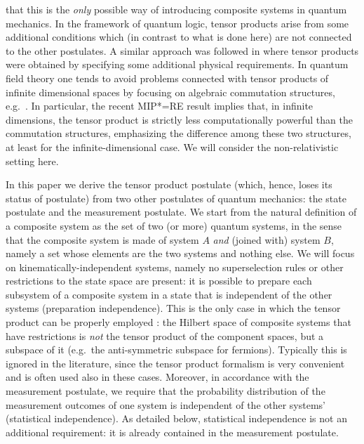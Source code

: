 \documentclass[aps,prl,amsmath,amssymb,twocolumn,nofootinbib]{revtex4}
\theoremstyle{plain}
\theoremstyle{definition}
\theoremstyle{remark}
\begin{document}
	that this is the {\em only} possible way of introducing composite
	systems in quantum mechanics. In the framework of quantum logic,
	tensor products arise from some additional conditions \cite{matolcsi}
	which (in contrast to what is done here) are not connected to the
	other postulates. A similar approach was followed in \cite{aerts}
	where tensor products were obtained by specifying some additional
	physical requirements. In quantum field theory one tends to avoid
	problems connected with tensor products of infinite dimensional spaces
	by focusing on algebraic commutation structures, e.g.~\cite{giddins}.
	In particular, the recent MIP*=RE result \cite{mipre} implies that, in
	infinite dimensions, the tensor product is strictly less
	computationally powerful than the commutation structures, emphasizing
	the difference among these two structures, at least for the
	infinite-dimensional case. We will consider the non-relativistic
	setting here.
	
	In this paper we derive the tensor product postulate (which, hence,
	loses its status of postulate) from two other postulates of quantum
	mechanics: the state postulate and the measurement postulate. We start
	from the natural definition of a composite system as the set of two
	(or more) quantum systems, in the sense that the composite system is
	made of system $A$ {\em and} (joined with) system $B$, namely a set
	whose elements are the two systems and nothing else. We will focus on
	kinematically-independent systems, namely no superselection rules or
	other restrictions to the state space are present: it is possible to
	prepare each subsystem of a composite system in a state that is
	independent of the other systems (preparation independence).  This is
	the only case in which the tensor product can be properly employed
	\cite{susskind,zanardi,zanardilloyd}: the Hilbert space of composite
	systems that have restrictions is {\em not} the tensor product of the
	component spaces, but a subspace of it (e.g.~the anti-symmetric
	subspace for fermions). Typically this is ignored in the literature,
	since the tensor product formalism is very convenient and is often
	used also in these cases. Moreover, in accordance with the measurement
	postulate, we require that the probability distribution of the
	measurement outcomes of one system is independent of the other systems' (statistical
	independence). As detailed below, statistical independence is not an
	additional requirement: it is already contained in the measurement
	postulate.
	
\end{document}

